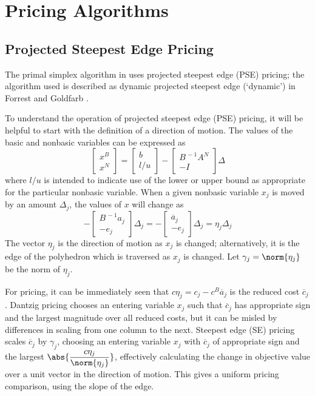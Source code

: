 \section{Pricing Algorithms}
\label{sec:PricingAlgorithms}

\subsection{Projected Steepest Edge Pricing}
\label{sec:PSEPricing}

The primal simplex algorithm in \dylp uses projected steepest edge (PSE)
pricing;
the algorithm used is described as dynamic projected steepest edge
(`dynamic') in Forrest and Goldfarb \cite{For92}.

To understand the operation of projected steepest edge (PSE) pricing, it
will be helpful to start with the definition of a direction of motion.
The values of the basic and nonbasic variables can be expressed as
\begin{equation*}
\begin{bmatrix} x^B \\ x^N \end{bmatrix} =
  \begin{bmatrix} b \\ l/u \end{bmatrix} -
  \begin{bmatrix} B^{\,-1}A^N \\ -I \end{bmatrix} \Delta
\end{equation*}
where $l/u$ is intended to indicate use of the lower or upper bound as
appropriate for the particular nonbasic variable.
When a given nonbasic variable $x_j$ is moved by an amount $\Delta_j$, the
values of $x$ will change as
\begin{equation*}
  -\begin{bmatrix} B^{\,-1}a_j \\ -e_j \end{bmatrix} \Delta_j =
  -\begin{bmatrix} \overline{a}_j \\ -e_j \end{bmatrix} \Delta_j =
  \eta_j\Delta_j
\end{equation*}
The vector $\eta_j$ is the direction of motion as $x_j$ is changed;
alternatively, it is the edge of the polyhedron which is traversed as $x_j$ is
changed.
Let $\gamma_j = \norm{\eta_j}$ be the norm of $\eta_j$.

For pricing, it can be immediately seen that
$c\eta_j = c_j - c^B \overline{a}_j$ is the reduced cost $\overline{c}_j$.
Dantzig pricing chooses an entering variable $x_j$ such
that $\overline{c}_j$ has appropriate sign and the largest magnitude over all
reduced costs, but it can be misled by differences in scaling from
one column to the next.
Steepest edge (SE) pricing scales $\overline{c}_j$ by $\gamma_j$, choosing
an entering variable $x_j$ with $\overline{c}_j$ of appropriate sign
and the largest $\displaystyle \abs{\frac{c \eta_j}{\norm{\eta_j}}}$,
effectively
calculating the change in objective value over a unit vector in the direction
of motion.
This gives a uniform pricing comparison, using the slope of the edge.

